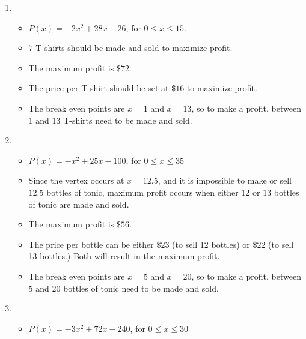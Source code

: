 \documentclass{ximera}
\begin{document}
\begin{enumerate}
\setcounter{enumi}{\value{HW}}

\item \begin{itemize}

\item $P(x) = -2x^2+28x-26$, for $0 \leq x \leq 15$.

\item $7$ T-shirts should be made and  sold to maximize profit. 

\item The maximum profit is $\$72$. 

\item The price per T-shirt should be set at $\$16$ to maximize profit. 

\item The break even points are $x=1$ and $x=13$, so to make a profit, between 1 and 13 T-shirts need to be made and sold.

\end{itemize}

\item  \begin{itemize}

\item   $P(x) = -x^2+25x-100$, for $0 \leq x \leq 35$

\item  Since the vertex occurs at $x=12.5$, and it is impossible to make or sell $12.5$ bottles of tonic, maximum profit occurs when either $12$ or $13$ bottles of tonic are made and sold.

\item  The maximum profit is $\$56$.

\item  The price per bottle can be either $\$23$ (to sell 12 bottles) or $\$22$ (to sell 13 bottles.)  Both will result in the maximum profit.

\item The break even points are $x=5$ and $x=20$, so to make a profit, between 5 and 20 bottles of tonic need to be made and sold.

\end{itemize}



\item \begin{itemize}

\item  $P(x) = -3x^2+72x-240$, for $0 \leq x \leq 30$


\end{itemize}
\end{enumerate}
\end{document}
